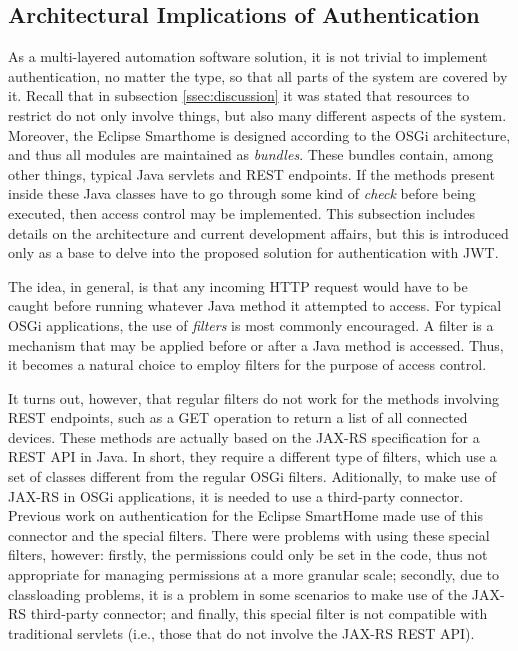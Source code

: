 \documentclass[12pt]{article}
\begin{document}
\subsection{Architectural Implications of Authentication}

As a multi-layered automation software solution, it is not trivial to implement authentication, no matter the type, so that all parts of the system are covered by it. Recall that in subsection \ref{ssec:discussion} it was stated that resources to restrict do not only involve things, but also many different aspects of the system. Moreover, the Eclipse Smarthome is designed according to the OSGi architecture, and thus all modules are maintained as \emph{bundles}. These bundles contain, among other things, typical Java servlets and REST endpoints. If the methods present inside these Java classes have to go through some kind of \emph{check} before being executed, then access control may be implemented. This subsection includes details on the architecture and current development affairs, but this is introduced only as a base to delve into the proposed solution for authentication with JWT.

The idea, in general, is that any incoming HTTP request would have to be caught before running whatever Java method it attempted to access. For typical OSGi applications, the use of \emph{filters} is most commonly encouraged. A filter is a mechanism that may be applied before or after a Java method is accessed. Thus, it becomes a natural choice to employ filters for the purpose of access control.

It turns out, however, that regular filters do not work for the methods involving REST endpoints, such as a GET operation to return a list of all connected devices. These methods are actually based on the JAX-RS specification for a REST API in Java. In short, they require a different type of filters, which use a set of classes different from the regular OSGi filters. Aditionally, to make use of JAX-RS in OSGi applications, it is needed to use a third-party connector. Previous work on authentication for the Eclipse SmartHome made use of this connector and the special filters. There were problems with using these special filters, however: firstly, the permissions could only be set in the code, thus not appropriate for managing permissions at a more granular scale; secondly, due to classloading problems, it is a problem in some scenarios to make use of the JAX-RS third-party connector; and finally, this special filter is not compatible with traditional servlets (i.e., those that do not involve the JAX-RS REST API).
\end{document}
